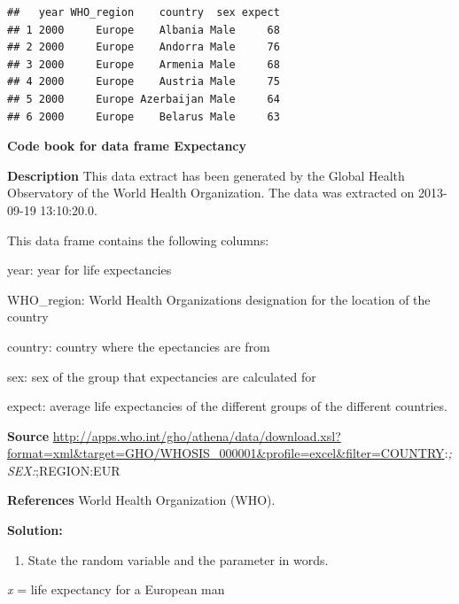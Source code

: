 \documentclass[
]{book}
\newenvironment{Shaded}{\begin{snugshade}}{\end{snugshade}}
\newcommand{\KeywordTok}[1]{\textcolor[rgb]{0.13,0.29,0.53}{\textbf{#1}}}
\newcommand{\NormalTok}[1]{#1}
\newcommand{\OperatorTok}[1]{\textcolor[rgb]{0.81,0.36,0.00}{\textbf{#1}}}
\newcommand{\StringTok}[1]{\textcolor[rgb]{0.31,0.60,0.02}{#1}}
\providecommand{\tightlist}{%
  \setlength{\itemsep}{0pt}\setlength{\parskip}{0pt}}
\begin{document}
\begin{Shaded}
\end{Shaded}

\begin{verbatim}
##   year WHO_region    country  sex expect
## 1 2000     Europe    Albania Male     68
## 2 2000     Europe    Andorra Male     76
## 3 2000     Europe    Armenia Male     68
## 4 2000     Europe    Austria Male     75
## 5 2000     Europe Azerbaijan Male     64
## 6 2000     Europe    Belarus Male     63
\end{verbatim}

\textbf{Code book for data frame Expectancy}

\textbf{Description}
This data extract has been generated by the Global Health Observatory of the World Health Organization. The data was extracted on 2013-09-19 13:10:20.0.

This data frame contains the following columns:

year: year for life expectancies

WHO\_region: World Health Organizations designation for the location of the country

country: country where the epectancies are from

sex: sex of the group that expectancies are calculated for

expect: average life expectancies of the different groups of the different countries.

\textbf{Source}
\url{http://apps.who.int/gho/athena/data/download.xsl?format=xml\&target=GHO/WHOSIS_000001\&profile=excel\&filter=COUNTRY}:\emph{;SEX:};REGION:EUR

\textbf{References}
World Health Organization (WHO).

\textbf{Solution:}

\begin{enumerate}
\def\labelenumi{\arabic{enumi}.}
\tightlist
\item
  State the random variable and the parameter in words.
\end{enumerate}

\emph{x} = life expectancy for a European man
\end{document}
